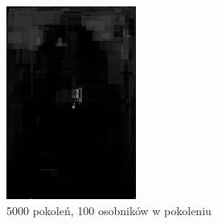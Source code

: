 \begin{figure}[!htb]
\begin{subfigure}[b]{0.3\textwidth}
         \includegraphics[width=\textwidth]{images/mona/dependence/5000_100.png}
         \caption{5000 pokoleń, 100 osobników w pokoleniu}
    \end{subfigure}
    \begin{subfigure}[b]{0.3\textwidth}
        \centering
        \label{fig:dependence_1000_500}

\end{subfigure}
\end{figure}
